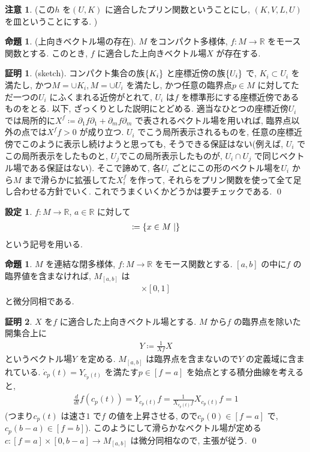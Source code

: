 \documentclass[10pt, fleqn, label-section=none]{bxjsarticle}
\theoremstyle{definition}
\newtheorem{prop}[dfn]{命題}
\newtheorem{setting}[dfn]{設定}
\newtheorem*{pf*}{証明}
\newtheorem{remark}[dfn]{注意}
\newcommand{\cbra}[1]{\mleft\{#1\mright\}}
\renewcommand{\;}{\, ; \,}
\begin{document}
\begin{remark}
(この$h$ を$(U, K)$ に適合したプリン関数ということにし, $(K,V,L,U)$ を皿ということにする. ) 
\end{remark}



\begin{prop}(上向きベクトル場の存在). $M$ をコンパクト多様体, $f: M \rightarrow \mathbb R$ をモース関数とする. このとき, $f$ に適合した上向きベクトル場$X$ が存在する.

\end{prop}
\begin{pf*}(sketch).
コンパクト集合の族$\cbra{K_i}$ と座標近傍の族$\cbra{U_i}$ で, $K_i \subset U_i$ を満たし, かつ$M = \cup K_i, M = \cup U_i$ を満たし, かつ任意の臨界点$p\in M$ に対してただ一つの$U_i$ にふくまれる近傍がとれて, $U_i$ は$f$ を標準形にする座標近傍であるものをとる. 
以下, ざっくりとした説明にとどめる. 適当なひとつの座標近傍$U_i$ では局所的に$X^f \coloneqq \partial_1 f  \partial_1 + \partial_m f \partial_m$ で表されるベクトル場を用いれば, 臨界点以外の点では$X^f f > 0$ が成り立つ. $U_i$ でこう局所表示されるものを, 任意の座標近傍でこのように表示し続けようと思っても, そうできる保証はない(例えば, $U_i$ でこの局所表示をしたものと, $U_j$でこの局所表示したものが, $U_i \cap U_j$ で同じベクトル場である保証はない). そこで諦めて, 各$U_i$ ごとにこの形のベクトル場を$U_i$ から$M$ まで滑らかに拡張してた$X^f_{i}$ を作って, それらをプリン関数を使って全て足し合わせる方針でいく. これでうまくいくかどうかは要チェックである. 
\qed
\end{pf*}

\begin{setting}$f: M \rightarrow \mathbb R$, $a \in \mathbb R$ に対して
\begin{align*}[f = a] \coloneqq \cbra{x \in M \mid } \end{align*}
という記号を用いる. 
\end{setting}

\begin{prop}
$M$ を連結な閉多様体, $f: M \rightarrow \mathbb R$ をモース関数とする. $[a,b]$ の中に$f$ の臨界値を含まなければ, $M_{[a,b]}$ は
\begin{align*} [f = a] \times [0,1]  \end{align*}
と微分同相である. 
\end{prop}
\begin{pf*}
$X$ を$f$ に適合した上向きベクトル場とする. $M$ から$f$ の臨界点を除いた開集合上に
\begin{align*} Y \coloneqq \frac{1}{Xf} X \end{align*}
というベクトル場$Y$ を定める. $M_{[a,b]}$ は臨界点を含まないので$Y$ の定義域に含まれている. 
$\dot c_p(t) = Y_{c_p (t)} $ を満たす$p \in [f = a]$ を始点とする積分曲線を考えると, 
\begin{align*} \frac{d}{dt} f(c_p(t)) = Y_{c_p(t)} f = \frac{1}{X_{c_p(t)}f} X_{c_p(t)} f = 1 \end{align*}
(つまり$c_p(t)$ は速さ$1$ で$f$ の値を上昇させる, ので$c_p(0) \in [f = a]$ で, $c_p(b-a) \in [f = b]$). このようにして滑らかなベクトル場が定める$c: [f = a] \times [0, b-a] \rightarrow M_{[a,b]}$ は微分同相なので, 主張が従う.
\qed
\end{pf*}
\end{document}
